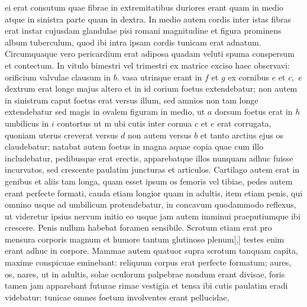 \pend
\newpage
\pstart\noindent ei erat consutum quae fibrae in extremitatibus duriores erant quam in medio atque in sinistra parte quam in dextra. In medio autem cordis inter istas fibras erat instar cujusdam glandulae pisi romani magnitudine et figura prominens album tuberculum, quod ibi intra ipsam cordis tunicam erat adnatum. Circumquaque vero pericardium erat adiposa quadam veluti spuma conspersum et contectum.
\pend%
\vspace{1.0em}%
\pstart%
\noindent%
In vitulo bimestri vel trimestri ex matrice exciso haec observavi: orificium valvulae
clausum in $b.$ vasa utrinque erant in $f$ et $g$ ex cornibus $e$ et $c,$ $e$ dextrum erat longe majus altero et in id corium foetus extendebatur; non autem in sinistrum caput foetus erat versus illum, sed amnios non tam longe extendebatur sed magis in ovalem figuram in medio, ut $a$ dorsum foetus erat in $h$ umbilicus in $i$ contortus ut m ubi cutis inter cornua $c$ et $e$ erat corrugata, quoniam uterus creverat versus $d$ non autem versus $b$ et tanto arctius ejus os claudebatur;
natabat autem foetus in magna aquae copia quae cum illo includebatur, pedibusque\label{pedibusque} erat erectis, apparebatque illos nunquam adhuc fuisse incurvatos, sed crescente paulatim
juncturas et articulos. Cartilago autem erat in genibus et aliis tam longa, quam esset ipsum os femoris vel tibiae, pedes autem erant perfecte formati, cauda etiam longior quam in adultis, item etiam penis, qui omnino usque ad umbilicum protendebatur,
in concavum quodammodo reflexus, ut videretur ipsius nervum initio eo usque
jam autem imminui praeputiumque ibi crescere. Penis nullum habebat foramen sensibile.
Scrotum etiam erat pro mensura corporis magnum et humore tantum glutinoso plenum[,]
testes enim erant adhuc in corpore. Mammae\label{mammae} autem quatuor supra scrotum tanquam  capita, maxime conspicuae eminebant: reliquum corpus erat perfecte formatum; aures, os, nares, ut in adultis, solae oculorum palpebrae nondum erant divisae, foris tamen jam apparebant futurae rimae vestigia et tensa ibi cutis paulatim eradi videbatur: tunicae omnes foetum involventes erant pellucidae,

